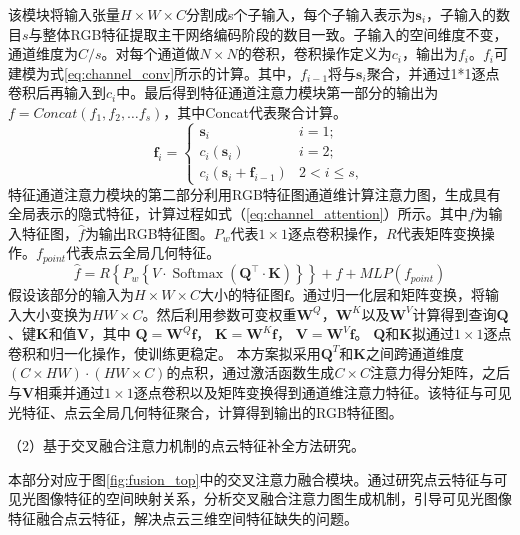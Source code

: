 \documentclass[12pt]{article}
\begin{document}
该模块将输入张量$H \times W \times C$分割成s个子输入，每个子输入表示为$\boldsymbol{s}_{i}$，子输入的数目$s$与整体RGB特征提取主干网络编码阶段的数目一致。子输入的空间维度不变，通道维度为$C/s$。对每个通道做$N \times N $的卷积，卷积操作定义为$c_i$，输出为$f_i$。$f_{i}$可建模为式\ref{eq:channel_conv}所示的计算。其中，$f_{i-1}$将与$\boldsymbol{s}_{i}$聚合，并通过1*1逐点卷积后再输入到$c_i$中。最后得到特征通道注意力模块第一部分的输出为$f=Concat \left(f_{1}, f_{2}, \ldots f_{s}\right)$，其中Concat代表聚合计算。
\begin{equation}
    \boldsymbol{f}_{i}=\left\{\begin{array}{ll}\boldsymbol{s}_{i} & i=1 ; \\ c_{i}\left(\boldsymbol{s}_{i}\right) & i=2 ; \\ c_{i}\left(\boldsymbol{s}_{i}+\boldsymbol{f}_{i-1}\right) & 2<i \leq s, \end{array}\right.
    \label{eq:channel_conv}
\end{equation}
特征通道注意力模块的第二部分利用RGB特征图通道维计算注意力图，生成具有全局表示的隐式特征，计算过程如式（\ref{eq:channel_attention}）所示。其中$f$为输入特征图，$\hat{f}$为输出RGB特征图。$P_{w}$代表$1 \times 1$逐点卷积操作，$R$代表矩阵变换操作。$f_{point}$代表点云全局几何特征。
\begin{equation}
    \hat{f}=R\left\{P_{w}\left\{V \cdot \operatorname{Softmax }\left(\boldsymbol{Q}^{\top} \cdot \boldsymbol{K}\right)\right\}\right\}+f+MLP\left(f_{point}\right)
    \label{eq:channel_attention}
\end{equation}
假设该部分的输入为$H \times W \times C$大小的特征图$\boldsymbol{f}$。通过归一化层和矩阵变换，将输入大小变换为$H W \times C$。然后利用参数可变权重$\boldsymbol{W}^{Q}$，$\boldsymbol{W}^{K}$以及$\boldsymbol{W}^{V}$计算得到查询$\boldsymbol{Q}$、键$\boldsymbol{K}$和值$\boldsymbol{V}$，其中
$\boldsymbol{Q}=\boldsymbol{W}^{Q} \boldsymbol{f}$，
$\boldsymbol{K}=\boldsymbol{W}^{K} \boldsymbol{f}$，
$\boldsymbol{V}=\boldsymbol{W}^{V} \boldsymbol{f}$。
$\boldsymbol{Q}$和$\boldsymbol{K}$拟通过$1 \times 1$逐点卷积和归一化操作，使训练更稳定。
本方案拟采用$\boldsymbol{Q}^{T}$和$\boldsymbol{K}$之间跨通道维度$(C \times H W) \cdot(H W \times C)$的点积，通过激活函数生成$C \times C$注意力得分矩阵，之后与$\boldsymbol{V}$相乘并通过$1 \times 1$逐点卷积以及矩阵变换得到通道维注意力特征。该特征与可见光特征、点云全局几何特征聚合，计算得到输出的RGB特征图。

（2）基于交叉融合注意力机制的点云特征补全方法研究。

本部分对应于图\ref{fig:fusion_top}中的交叉注意力融合模块。通过研究点云特征与可见光图像特征的空间映射关系，分析交叉融合注意力图生成机制，引导可见光图像特征融合点云特征，解决点云三维空间特征缺失的问题。
\end{document}
